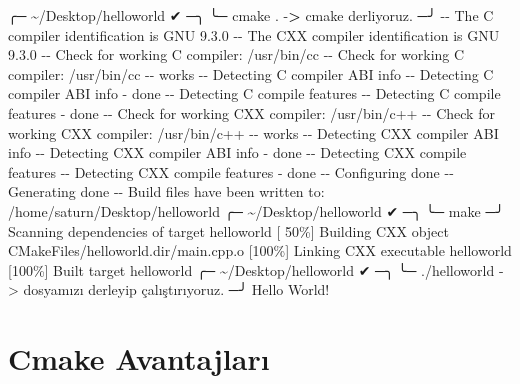 \documentclass[
]{book}
\newenvironment{Shaded}{\begin{snugshade}}{\end{snugshade}}
\newcommand{\BuiltInTok}[1]{#1}
\newcommand{\ExtensionTok}[1]{#1}
\newcommand{\FunctionTok}[1]{\textcolor[rgb]{0.00,0.00,0.00}{#1}}
\newcommand{\NormalTok}[1]{#1}
\newcommand{\OperatorTok}[1]{\textcolor[rgb]{0.81,0.36,0.00}{\textbf{#1}}}
\newcommand{\OtherTok}[1]{\textcolor[rgb]{0.56,0.35,0.01}{#1}}
\begin{document}
\begin{Shaded}
\begin{Highlighting}[]
\NormalTok{╭─ }\ExtensionTok{\textasciitilde{}/Desktop/helloworld}\NormalTok{                                                   ✔ ─╮}
\NormalTok{╰─ }\FunctionTok{cmake}\NormalTok{ .  {-}}\OperatorTok{>}\NormalTok{ cmake derliyoruz.                                            ─╯}
\ExtensionTok{{-}{-}}\NormalTok{ The C compiler identification is GNU 9.3.0}
\ExtensionTok{{-}{-}}\NormalTok{ The CXX compiler identification is GNU 9.3.0}
\ExtensionTok{{-}{-}}\NormalTok{ Check for working C compiler: /usr/bin/cc}
\ExtensionTok{{-}{-}}\NormalTok{ Check for working C compiler: /usr/bin/cc {-}{-} works}
\ExtensionTok{{-}{-}}\NormalTok{ Detecting C compiler ABI info}
\ExtensionTok{{-}{-}}\NormalTok{ Detecting C compiler ABI info {-} done}
\ExtensionTok{{-}{-}}\NormalTok{ Detecting C compile features}
\ExtensionTok{{-}{-}}\NormalTok{ Detecting C compile features {-} done}
\ExtensionTok{{-}{-}}\NormalTok{ Check for working CXX compiler: /usr/bin/c++}
\ExtensionTok{{-}{-}}\NormalTok{ Check for working CXX compiler: /usr/bin/c++ {-}{-} works}
\ExtensionTok{{-}{-}}\NormalTok{ Detecting CXX compiler ABI info}
\ExtensionTok{{-}{-}}\NormalTok{ Detecting CXX compiler ABI info {-} done}
\ExtensionTok{{-}{-}}\NormalTok{ Detecting CXX compile features}
\ExtensionTok{{-}{-}}\NormalTok{ Detecting CXX compile features {-} done}
\ExtensionTok{{-}{-}}\NormalTok{ Configuring done}
\ExtensionTok{{-}{-}}\NormalTok{ Generating done}
\ExtensionTok{{-}{-}}\NormalTok{ Build files have been written to: /home/saturn/Desktop/helloworld}
\NormalTok{╭─ }\ExtensionTok{\textasciitilde{}/Desktop/helloworld}\NormalTok{                                                   ✔ ─╮}
\NormalTok{╰─ }\FunctionTok{make}\NormalTok{                                                                     ─╯}
\ExtensionTok{Scanning}\NormalTok{ dependencies of target helloworld}
\BuiltInTok{[}\NormalTok{ 50\%] Building CXX object CMakeFiles/helloworld.dir/main.cpp.o}
\NormalTok{[100\%] Linking CXX executable helloworld}
\NormalTok{[100\%] Built target helloworld}
\NormalTok{╭─ \textasciitilde{}/Desktop/helloworld                                                   ✔ ─╮}
\NormalTok{╰─ ./helloworld {-}}\OtherTok{>}\NormalTok{ dosyamızı derleyip çalıştırıyoruz.                       ─╯}
\NormalTok{Hello World!}
\end{Highlighting}
\end{Shaded}

\hypertarget{cmake-avantajlarux131}{%
\section{Cmake Avantajları}\label{cmake-avantajlarux131}}
\end{document}
